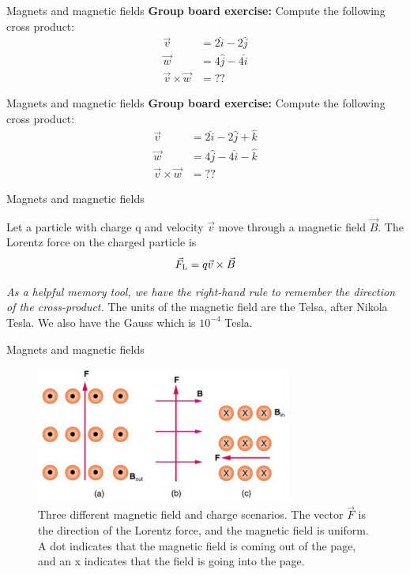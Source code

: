 \documentclass{beamer}
\begin{document}
\begin{frame}{Magnets and magnetic fields}
\textbf{Group board exercise:} Compute the following cross product:
\begin{align}
\vec{v} &= 2\hat{i}-2\hat{j} \\
\vec{w} &= 4\hat{j}-4\hat{i} \\
\vec{v} \times \vec{w} &= ??
\end{align}
\end{frame}

\begin{frame}{Magnets and magnetic fields}
\textbf{Group board exercise:} Compute the following cross product:
\begin{align}
\vec{v} &= 2\hat{i}-2\hat{j}+\hat{k} \\
\vec{w} &= 4\hat{j}-4\hat{i}-\hat{k} \\
\vec{v} \times \vec{w} &= ??
\end{align}
\end{frame}

\begin{frame}{Magnets and magnetic fields}
\begin{tcolorbox}[colback=white,colframe=red!40!blue,title=The Lorentz Force]
\alert{Let a particle with charge q and velocity $\vec{v}$ move through a magnetic field $\vec{B}$. The Lorentz force on the charged particle is
\begin{equation}
\vec{F}_{\rm L} = q\vec{v} \times \vec{B}
\label{eq:Lorentz}
\end{equation}}
\end{tcolorbox}
\textit{As a helpful memory tool, we have the right-hand rule to
remember the direction of the cross-product.} The units of the
magnetic field are the Telsa, after Nikola Tesla. We also have
the Gauss which is $10^{-4}$ Tesla.
\end{frame}

\begin{frame}{Magnets and magnetic fields}
\begin{figure}
\centering
\includegraphics[width=0.75\textwidth]{figures/lorentzProblem.png}
\caption{\label{fig:lorentzProblem} Three different magnetic field and charge scenarios. The
vector $\vec{F}$ is the direction of the Lorentz force, and the magnetic field
is uniform. A dot indicates that the magnetic field is coming out of
the page, and an x indicates that the field is going into the page.}
\end{figure}
\end{frame}
\end{document}
